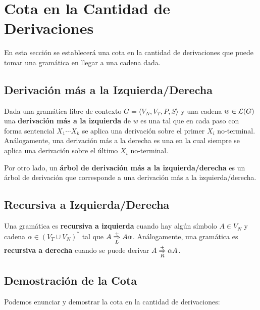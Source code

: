 \section{Cota en la Cantidad de Derivaciones}

En esta sección se establecerá una cota en la cantidad de derivaciones que puede tomar una gramática en llegar a una cadena dada.

\subsection{Derivación más a la Izquierda/Derecha}

Dada una gramática libre de contexto $G = \langle V_N, V_T, P, S \rangle$ y una cadena $w \in \mathcal{L}(G)$ una \textbf{derivación más a la izquierda} de $w$ es una tal que en cada paso con forma sentencial $X_1 \cdots X_k$ se aplica una derivación sobre el primer $X_i$ no-terminal. Análogamente, una derivación más a la derecha es una en la cual siempre se aplica una derivación sobre el último $X_i$ no-terminal.

Por otro lado, un \textbf{árbol de derivación más a la izquierda/derecha} es un árbol de derivación que corresponde a una derivación más a la izquierda/derecha.

\subsection{Recursiva a Izquierda/Derecha}

Una gramática es \textbf{recursiva a izquierda} cuando hay algún símbolo $A \in V_N$ y cadena $\alpha \in (V_T \cup V_N)^*$ tal que $A \overset{+}{\underset{L}{\Rightarrow}} A \alpha$. Análogamente, una gramática es \textbf{recursiva a derecha} cuando se puede derivar $A \overset{+}{\underset{R}{\Rightarrow}} \alpha A$.

\subsection{Demostración de la Cota}

Podemos enunciar y demostrar la cota en la cantidad de derivaciones:

